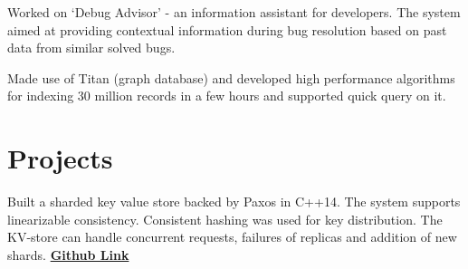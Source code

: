 \documentclass[]{resume-openfont}
\begin{document}
\begin{minipage}[t]{0.69\textwidth}
\begin{tightemize}
\item Worked on ‘Debug Advisor’ - an information assistant for developers. The system aimed at providing contextual information during bug resolution based on past data from similar solved bugs. 
\item Made use of Titan (graph database) and developed high performance algorithms for indexing 30 million records in a few hours and supported quick query on it.
\end{tightemize}
\sectionsep


\section{Projects}
Built a sharded key value store backed by Paxos in C++14. The system supports linearizable consistency. Consistent hashing was used for key distribution. The KV-store can handle concurrent requests, failures of replicas and addition of new shards. \textbf{\href{https://github.com/pranavr93/sharded_key_value_store}{Github Link}}
\sectionsep




\end{minipage}
\end{document}
